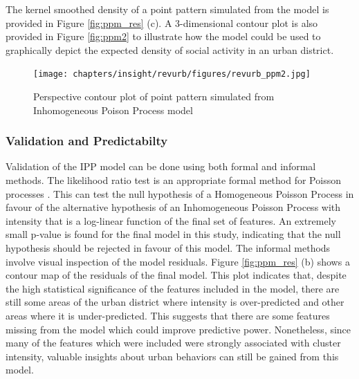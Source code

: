 {    The kernel smoothed density of a point pattern simulated from the model is provided in Figure \eqref{fig:ppm_res} (c). A 3-dimensional contour plot is also provided in
    Figure \eqref{fig:ppm2} to illustrate how the model could be used to graphically depict the expected density of social activity in an urban district.


    \begin{figure}[!h]
        \centering
        \texttt{[image: chapters/insight/revurb/figures/revurb\_ppm2.jpg]}
        \caption{Perspective contour plot of point pattern simulated from Inhomogeneous Poison Process model}
        \label{fig:ppm2}
    \end{figure}


    \subsubsection{Validation and Predictabilty}
    {
        Validation of the IPP model can be done using both formal and informal methods. The likelihood ratio test is an appropriate formal method for Poisson processes \cite{baddeley2006modeling}. This can test the null hypothesis of a Homogeneous Poisson Process in favour of the alternative hypothesis of an Inhomogeneous Poisson Process with intensity that is a log-linear function of the final set of features. An extremely small p-value is found for the final model in this study, indicating that the null hypothesis should be rejected in favour of this model. The informal methods involve visual inspection of the model residuals.
        \newline
        Figure \eqref{fig:ppm_res} (b) shows a contour map of the residuals of the final model. This plot indicates that, despite the high statistical significance of the features included in the model, there are still some areas of the urban district where intensity is over-predicted and other areas where it is under-predicted. This suggests that there are some features missing from the model which could improve predictive power. Nonetheless, since many of the features which were included were strongly associated with cluster intensity, valuable insights about urban behaviors can still be gained from this model.
    }

}
